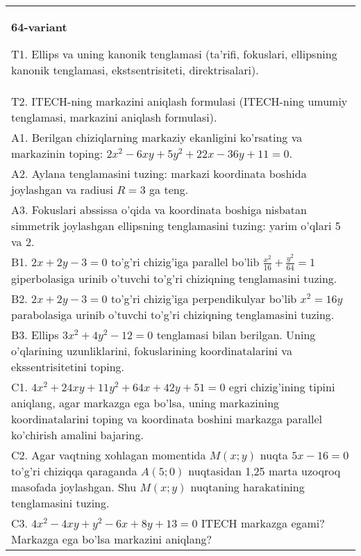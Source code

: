 \documentclass{article}
\begin{document}
\begin{tabular}{m{17cm}}
\textbf{64-variant}
\newline

T1. Ellips va uning kanonik tenglamasi (ta'rifi, fokuslari, ellipsning kanonik tenglamasi, ekstsentrisiteti, direktrisalari).\\

T2. ITECH-ning markazini aniqlash formulasi (ITECH-ning umumiy tenglamasi, markazini aniqlash formulasi).\\

A1. Berilgan chiziqlarning markaziy ekanligini ko'rsating va markazinin toping: $2x^{2}-6xy+5y^{2}+22x-36y+11=0$.\\

A2. Aylana tenglamasini tuzing: markazi koordinata boshida joylashgan va radiusi $R=3$ ga teng.\\

A3. Fokuslari abssissa o'qida va koordinata boshiga nisbatan simmetrik joylashgan ellipsning tenglamasini tuzing: yarim o'qlari 5 va 2.\\

B1. $2x + 2y - 3 = 0$ to'g'ri chizig'iga parallel bo'lib $\frac{x^{2}}{16} + \frac{y^{2}}{64} = 1$ giperbolasiga urinib o'tuvchi to'g'ri chiziqning tenglamasini tuzing.  \\

B2. $2x + 2y - 3 = 0$ to'g'ri chizig'iga perpendikulyar bo'lib $x^{2} = 16y$ parabolasiga urinib o'tuvchi to'g'ri chiziqning tenglamasini tuzing.  \\

B3. Ellips $3x^{2} + 4y^{2} - 12 = 0$ tenglamasi bilan berilgan. Uning o'qlarining uzunliklarini, fokuslarining koordinatalarini va ekssentrisitetini toping.  \\

C1. $4x^{2} + 24xy + 11y^{2} + 64x + 42y + 51 = 0$ egri chizig'ining tipini aniqlang, agar markazga ega bo'lsa, uning markazining koordinatalarini toping va koordinata boshini markazga parallel ko'chirish amalini bajaring.\\

C2. Agar vaqtning xohlagan momentida $M(x;y)$ nuqta $5x - 16 = 0$ to'g'ri chiziqqa qaraganda $A(5;0)$ nuqtasidan 1,25 marta uzoqroq masofada joylashgan. Shu $M(x;y)$ nuqtaning harakatining tenglamasini tuzing.  \\

C3. $4x^{2} - 4xy + y^{2} - 6x + 8y + 13 = 0$ ITECH markazga egami? Markazga ega bo'lsa markazini aniqlang?  \\

\end{tabular}
\vspace{1cm}
\end{document}
